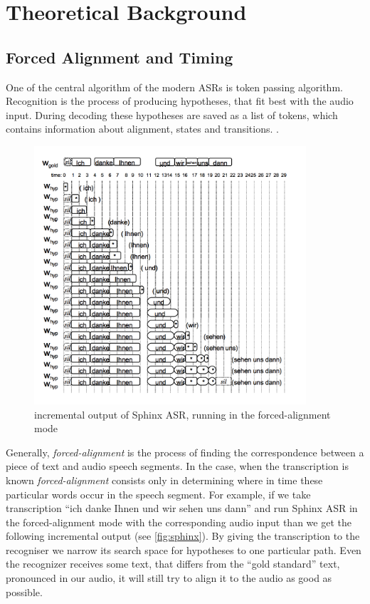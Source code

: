 \chapter{Theoretical Background}
\label{chap:terms}
 \section {Forced Alignment and Timing} 
One of the central algorithm  of the modern ASRs is token passing
algorithm. Recognition is the process of producing hypotheses, that fit best
with the audio input. During decoding these hypotheses are
saved as a list of tokens, which contains information about alignment, states
and transitions. \parencite {jurafskymartin2009}.

\begin{figure}[htbp]
  \centering
   \includegraphics[width=0.9\textwidth]{images/sphinxfa_output.png}
  \caption{incremental output of Sphinx ASR, running in the forced-alignment
  mode}
  \label{fig:sphinxfa}
\end{figure}

Generally, \textit {forced-alignment} is the process of finding the
correspondence between a piece of text and audio speech segments. In the case,
when the transcription is known \textit {forced-alignment} consists only in
determining where in time these particular words occur in the speech segment. 
For example, if we take transcription ``ich danke Ihnen und wir sehen uns dann''
and run Sphinx ASR in the forced-alignment mode with the corresponding audio input than we 
get the following incremental output (see \ref {fig:sphinx}).
By giving the transcription to the recogniser we narrow its search space for hypotheses to
one particular path. Even the recognizer receives some text, that differs from
the ``gold standard'' text, pronounced in our audio, it will still try to align it
to the audio as good as possible. 

